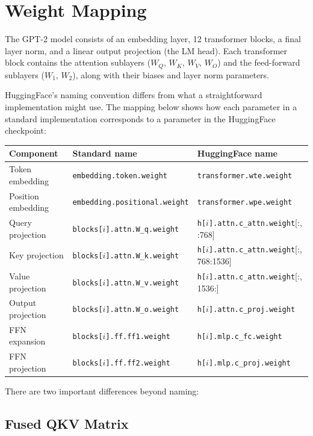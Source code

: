 \section{Weight Mapping}

The GPT-2 model consists of an embedding layer, 12 transformer blocks, a
final layer norm, and a linear output projection (the LM head). Each
transformer block contains the attention sublayers ($W_Q$, $W_K$, $W_V$,
$W_O$) and the feed-forward sublayers ($W_1$, $W_2$), along with their
biases and layer norm parameters.

HuggingFace's naming convention differs from what a straightforward
implementation might use. The mapping below shows how each parameter in a
standard implementation corresponds to a parameter in the HuggingFace
checkpoint:

\begin{center}
\begin{tabular}{lll}
\toprule
\textbf{Component} & \textbf{Standard name} & \textbf{HuggingFace name} \\
\midrule
Token embedding & \texttt{embedding.token.weight} & \texttt{transformer.wte.weight} \\
Position embedding & \texttt{embedding.positional.weight} & \texttt{transformer.wpe.weight} \\
Query projection & \texttt{blocks[$i$].attn.W\_q.weight} & \texttt{h[$i$].attn.c\_attn.weight}[:, :768] \\
Key projection & \texttt{blocks[$i$].attn.W\_k.weight} & \texttt{h[$i$].attn.c\_attn.weight}[:, 768:1536] \\
Value projection & \texttt{blocks[$i$].attn.W\_v.weight} & \texttt{h[$i$].attn.c\_attn.weight}[:, 1536:] \\
Output projection & \texttt{blocks[$i$].attn.W\_o.weight} & \texttt{h[$i$].attn.c\_proj.weight} \\
FFN expansion & \texttt{blocks[$i$].ff.ff1.weight} & \texttt{h[$i$].mlp.c\_fc.weight} \\
FFN projection & \texttt{blocks[$i$].ff.ff2.weight} & \texttt{h[$i$].mlp.c\_proj.weight} \\
\bottomrule
\end{tabular}
\end{center}

There are two important differences beyond naming:

\subsection{Fused QKV Matrix}

